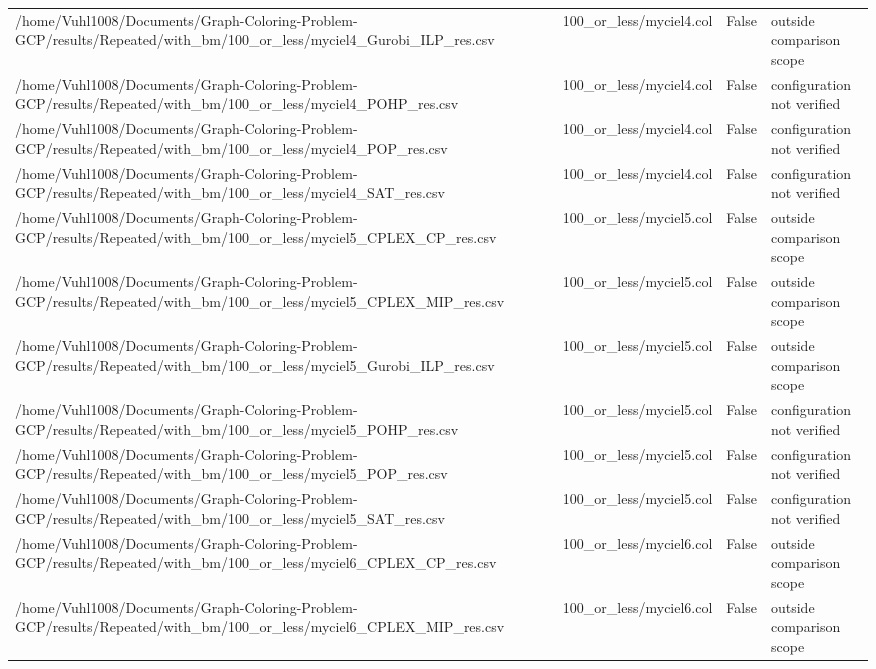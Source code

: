 \begin{table}[htbp]
\begin{tabular}{llll}
/home/Vuhl1008/Documents/Graph-Coloring-Problem-GCP/results/Repeated/with\_bm/100\_or\_less/myciel4\_Gurobi\_ILP\_res.csv & 100\_or\_less/myciel4.col & False & outside comparison scope \\
/home/Vuhl1008/Documents/Graph-Coloring-Problem-GCP/results/Repeated/with\_bm/100\_or\_less/myciel4\_POHP\_res.csv & 100\_or\_less/myciel4.col & False & configuration not verified \\
/home/Vuhl1008/Documents/Graph-Coloring-Problem-GCP/results/Repeated/with\_bm/100\_or\_less/myciel4\_POP\_res.csv & 100\_or\_less/myciel4.col & False & configuration not verified \\
/home/Vuhl1008/Documents/Graph-Coloring-Problem-GCP/results/Repeated/with\_bm/100\_or\_less/myciel4\_SAT\_res.csv & 100\_or\_less/myciel4.col & False & configuration not verified \\
/home/Vuhl1008/Documents/Graph-Coloring-Problem-GCP/results/Repeated/with\_bm/100\_or\_less/myciel5\_CPLEX\_CP\_res.csv & 100\_or\_less/myciel5.col & False & outside comparison scope \\
/home/Vuhl1008/Documents/Graph-Coloring-Problem-GCP/results/Repeated/with\_bm/100\_or\_less/myciel5\_CPLEX\_MIP\_res.csv & 100\_or\_less/myciel5.col & False & outside comparison scope \\
/home/Vuhl1008/Documents/Graph-Coloring-Problem-GCP/results/Repeated/with\_bm/100\_or\_less/myciel5\_Gurobi\_ILP\_res.csv & 100\_or\_less/myciel5.col & False & outside comparison scope \\
/home/Vuhl1008/Documents/Graph-Coloring-Problem-GCP/results/Repeated/with\_bm/100\_or\_less/myciel5\_POHP\_res.csv & 100\_or\_less/myciel5.col & False & configuration not verified \\
/home/Vuhl1008/Documents/Graph-Coloring-Problem-GCP/results/Repeated/with\_bm/100\_or\_less/myciel5\_POP\_res.csv & 100\_or\_less/myciel5.col & False & configuration not verified \\
/home/Vuhl1008/Documents/Graph-Coloring-Problem-GCP/results/Repeated/with\_bm/100\_or\_less/myciel5\_SAT\_res.csv & 100\_or\_less/myciel5.col & False & configuration not verified \\
/home/Vuhl1008/Documents/Graph-Coloring-Problem-GCP/results/Repeated/with\_bm/100\_or\_less/myciel6\_CPLEX\_CP\_res.csv & 100\_or\_less/myciel6.col & False & outside comparison scope \\
/home/Vuhl1008/Documents/Graph-Coloring-Problem-GCP/results/Repeated/with\_bm/100\_or\_less/myciel6\_CPLEX\_MIP\_res.csv & 100\_or\_less/myciel6.col & False & outside comparison scope \\

\end{tabular}
\end{table}
